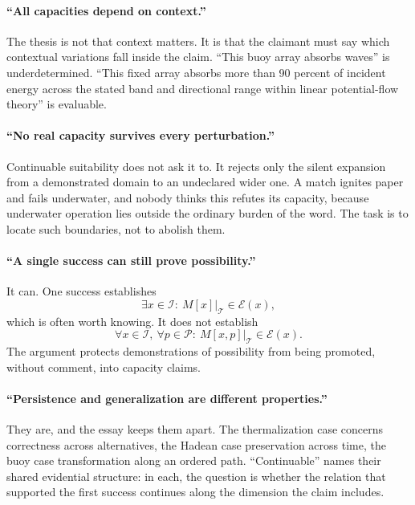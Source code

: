\documentclass[11pt]{article}
\theoremstyle{definition}
\newcommand{\Iset}{\mathcal I}
\newcommand{\Pset}{\mathcal P}
\newcommand{\Tset}{\mathcal T}
\newcommand{\Eset}{\mathcal E}
\begin{document}
\paragraph{``All capacities depend on context.''} The thesis is not that context matters. It is that the claimant must say which contextual variations fall inside the claim. ``This buoy array absorbs waves'' is underdetermined. ``This fixed array absorbs more than 90 percent of incident energy across the stated band and directional range within linear potential-flow theory'' is evaluable.

\paragraph{``No real capacity survives every perturbation.''} Continuable suitability does not ask it to. It rejects only the silent expansion from a demonstrated domain to an undeclared wider one. A match ignites paper and fails underwater, and nobody thinks this refutes its capacity, because underwater operation lies outside the ordinary burden of the word. The task is to locate such boundaries, not to abolish them.

\paragraph{``A single success can still prove possibility.''} It can. One success establishes
\begin{equation}
\exists x\in\Iset:\ M[x]\big|_{\Tset}\in\Eset(x),
\end{equation}
which is often worth knowing. It does not establish
\begin{equation}
\forall x\in\Iset,\ \forall p\in\Pset:\ M[x,p]\big|_{\Tset}\in\Eset(x).
\end{equation}
The argument protects demonstrations of possibility from being promoted, without comment, into capacity claims.

\paragraph{``Persistence and generalization are different properties.''} They are, and the essay keeps them apart. The thermalization case concerns correctness across alternatives, the Hadean case preservation across time, the buoy case transformation along an ordered path. ``Continuable'' names their shared evidential structure: in each, the question is whether the relation that supported the first success continues along the dimension the claim includes.
\end{document}
